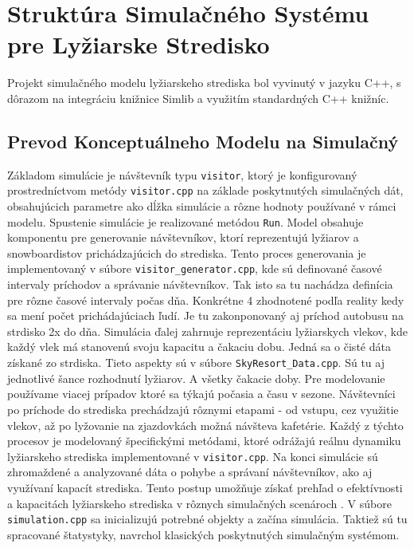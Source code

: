 ﻿\section{Struktúra Simulačného Systému pre Lyžiarske Stredisko}
Projekt simulačného modelu lyžiarskeho strediska bol vyvinutý v jazyku C++, s dôrazom na integráciu knižnice Simlib a využitím standardných C++ knižníc.
\subsection{Prevod Konceptuálneho Modelu na Simulačný}
Základom simulácie je návštevník typu \texttt{visitor}, ktorý je konfigurovaný prostredníctvom metódy \texttt{visitor.cpp} na základe poskytnutých simulačných dát, obsahujúcich parametre ako dĺžka simulácie a rôzne hodnoty používané v rámci modelu. Spustenie simulácie je realizované metódou \texttt{Run}.
Model obsahuje komponentu pre generovanie návštevníkov, ktorí reprezentujú lyžiarov a snowboardistov prichádzajúcich do strediska. Tento proces generovania je implementovaný v súbore \texttt{visitor_generator.cpp}, kde sú definované časové intervaly príchodov a správanie návštevníkov. Tak isto sa tu nachádza definícia pre rôzne časové intervaly počas dňa.  Konkrétne 4 zhodnotené podľa reality kedy sa mení počet prichádajúciach ľudí. Je tu zakonponovaný aj príchod autobusu na strdisko 2x do dňa. 
Simulácia ďalej zahrnuje reprezentáciu lyžiarskych vlekov, kde každý vlek má stanovenú svoju kapacitu a čakaciu dobu. Jedná sa o čisté dáta získané zo strdiska. Tieto aspekty sú v súbore \texttt{SkyResort_Data.cpp}. Sú tu aj jednotlivé šance rozhodnutí lyžiarov. A všetky čakacie doby. Pre modelovanie používame viacej prípadov ktoré sa týkajú počasia a času v sezone.
Návštevníci po príchode do strediska prechádzajú rôznymi etapami - od vstupu, cez využitie vlekov, až po lyžovanie na zjazdovkách možná návšteva kafetérie. Každý z týchto procesov je modelovaný špecifickými metódami, ktoré odrážajú reálnu dynamiku lyžiarskeho strediska implementované v \texttt{visitor.cpp}.
Na konci simulácie sú zhromaždené a analyzované dáta o pohybe a správaní návštevníkov, ako aj využívaní kapacít strediska. Tento postup umožňuje získať prehľad o efektívnosti a kapacitách lyžiarskeho strediska v rôznych simulačných scenároch .
V súbore \texttt{simulation.cpp} sa inicializujú potrebné objekty a začína simulácia. Taktiež sú tu spracované štatystyky, navrchol klasických poskytnutých simulačným systémom.